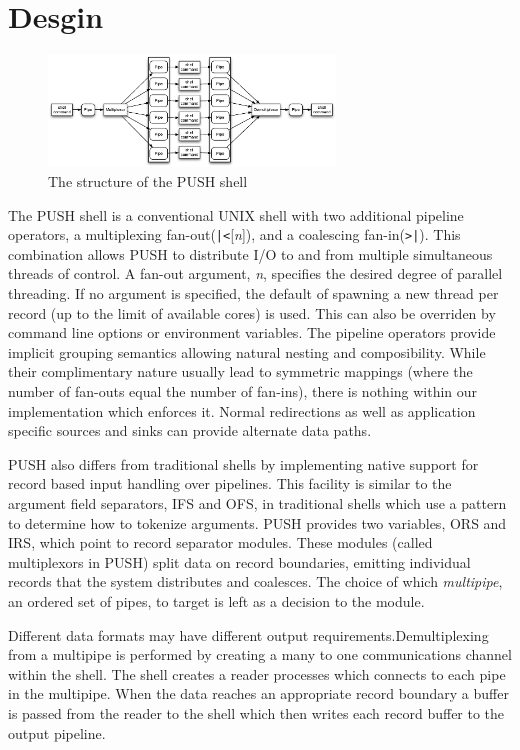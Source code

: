 \section{Desgin}

\begin{figure}[htp]
\centering
\includegraphics[width=3in]{pipestruct.eps}
\caption{The structure of the PUSH shell}
\label{fig:pipestruct}
\end{figure}

The PUSH shell is a conventional UNIX shell with 
two additional pipeline operators, a multiplexing 
fan-out(\verb!|<![\emph{n}]), and a coalescing fan-in(\verb!>|!).
This combination allows PUSH to distribute I/O to and from multiple
simultaneous threads of control.
A fan-out argument, \emph{n}, specifies the desired degree of parallel
threading.  If no argument is specified, the default of spawning a new
thread per record (up to the limit of available cores) is used.  This can
also be overriden by command line options or environment variables.
The pipeline operators provide implicit grouping semantics allowing natural
nesting and composibility.
While their complimentary nature usually lead to symmetric
mappings (where the number of fan-outs equal the number of fan-ins), there is
nothing within our implementation which enforces it.
Normal redirections as well as application specific sources and sinks
can provide alternate data paths.

PUSH also differs from traditional shells by implementing native support for
record based input handling over pipelines. This facility is similar to the
argument field separators, IFS and OFS, in traditional shells which use a
pattern to determine how to tokenize arguments. PUSH provides two variables,
ORS and IRS, which point to record separator modules. These modules
(called multiplexors in PUSH) split data on record boundaries, emitting
individual records that the system distributes and coalesces.
The choice of which \emph{multipipe}, an ordered set of pipes, to target is
left as a decision to the module.

Different data formats may have different output requirements.Demultiplexing from a multipipe is performed by creating a many to one
communications channel within the shell. The shell creates a reader processes
which connects to each pipe in the multipipe. When the data reaches an
appropriate record boundary a buffer is passed from the reader to the shell
which then writes each record buffer to the output pipeline.

